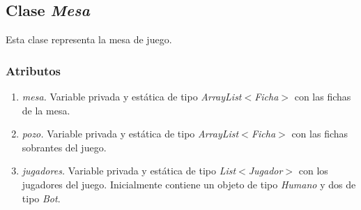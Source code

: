 \documentclass[12pt]{article}
\begin{document}
  \subsection{Clase \textit{Mesa}} 
  Esta clase representa la mesa de juego. 

  \subsubsection{Atributos}
  \begin{enumerate}
    \item \textit{mesa.} Variable privada y estática de tipo \textit{ArrayList$<$Ficha$>$} con las fichas de la mesa.
    \item \textit{pozo.} Variable privada y estática de tipo \textit{ArrayList$<$Ficha$>$} con las fichas sobrantes del juego.
    \item \textit{jugadores.} Variable privada y estática de tipo \textit{List$<$Jugador$>$} con los jugadores del juego. Inicialmente contiene un objeto de tipo \textit{Humano} y dos de tipo \textit{Bot}.
  \end{enumerate}
\end{document}
